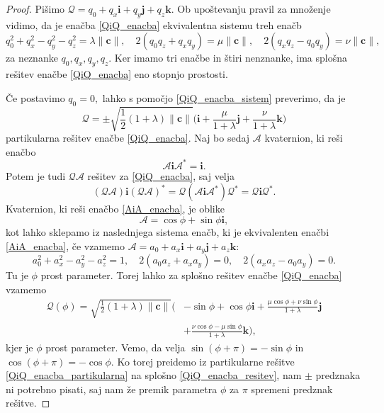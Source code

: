 \documentclass[12pt,a4paper,twoside]{article}
\theoremstyle{definition} %
\theoremstyle{plain} %
\theoremstyle{primerstyle}
\numberwithin{equation}{section}  %
\newcommand{\cV}{\mathbf{c}}
\newcommand{\iV}{\mathbf{i}}
\newcommand{\jV}{\mathbf{j}}
\newcommand{\kV}{\mathbf{k}}
\newcommand{\AQ}{\mathcal{A}}
\newcommand{\QQ}{\mathcal{Q}}
\begin{document}
\begin{proof}
	Pišimo $\QQ=q_0+q_x\iV+q_y\jV+q_z\kV.$ Ob upoštevanju pravil za množenje vidimo, da je enačba \eqref{QiQ_enacba} ekvivalentna sistemu treh enačb
	\begin{equation}
		\label{QiQ_enacba_sistem}
		q_0^2+q_x^2-q_y^2-q_z^2=\lambda\lVert\cV\rVert,\quad 2(q_0q_z+q_xq_y)=\mu\lVert\cV\rVert,\quad 2(q_xq_z-q_0q_y)=\nu\lVert\cV\rVert,
	\end{equation}
	za neznanke $q_0,q_x,q_y,q_z.$ Ker imamo tri enačbe in štiri nenznanke, ima splošna rešitev enačbe \eqref{QiQ_enacba} eno stopnjo prostosti.
	
	Če postavimo $q_0=0,$ lahko s pomočjo \eqref{QiQ_enacba_sistem} preverimo, da je
	\begin{equation}
		\label{QiQ_enacba_partikularna}
		\QQ=\pm\sqrt{\frac{1}{2}(1+\lambda)\lVert\cV\rVert}\Big(\iV+\frac{\mu}{1+\lambda}\jV+\frac{\nu}{1+\lambda}\kV\Big)
	\end{equation}
	partikularna rešitev enačbe \eqref{QiQ_enacba}. Naj bo sedaj $\AQ$ kvaternion, ki reši enačbo
	\begin{equation}
		\label{AiA_enacba}
		\AQ\iV\AQ^*=\iV.
	\end{equation}
	Potem je tudi $\QQ\AQ$ rešitev za \eqref{QiQ_enacba}, saj velja
	$$(\QQ\AQ)\iV(\QQ\AQ)^*=\QQ(\AQ\iV\AQ^*)\QQ^*=\QQ\iV\QQ^*.$$
	Kvaternion, ki reši enačbo \eqref{AiA_enacba}, je oblike
	\begin{equation}
		\label{AiA_enacba_resitev}
		\AQ=\cos\phi+\sin\phi\iV,
	\end{equation}
	kot lahko sklepamo iz naslednjega sistema enačb, ki je ekvivalenten enačbi \eqref{AiA_enacba}, če vzamemo $\AQ=a_0+a_x\iV+a_y\jV+a_z\kV$:
	$$a_0^2+a_x^2-a_y^2-a_z^2=1,\quad 2(a_0a_z+a_xa_y)=0,\quad 2(a_xa_z-a_0a_y)=0.$$
	Tu je $\phi$ prost parameter. Torej lahko za splošno rešitev enačbe \eqref{QiQ_enacba} vzamemo
	\begin{align*}
		\QQ(\phi)=\sqrt{\frac{1}{2}(1+\lambda)\lVert\cV\rVert}\Big(&-\sin\phi+\cos\phi\iV+\frac{\mu\cos\phi+\nu\sin\phi}{1+\lambda}\jV\\
		&+\frac{\nu\cos\phi-\mu\sin\phi}{1+\lambda}\kV\Big),
	\end{align*}
	kjer je $\phi$ prost parameter. Vemo, da velja $\sin(\phi+\pi)=-\sin\phi$ in $\cos(\phi+\pi)=-\cos\phi.$ Ko torej preidemo iz partikularne rešitve \eqref{QiQ_enacba_partikularna} na splošno \eqref{QiQ_enacba_resitev}, nam $\pm$ predznaka ni potrebno pisati, saj nam že premik parametra $\phi$ za $\pi$ spremeni predznak rešitve.
\end{proof}
\end{document}
